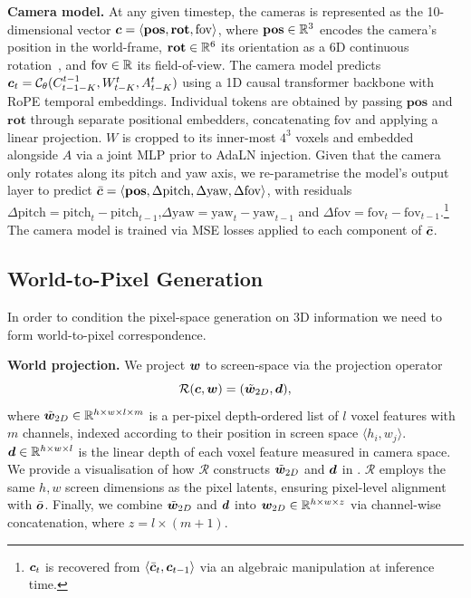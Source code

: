 \textbf{Camera model.} At any given timestep, the cameras is represented as the 10-dimensional vector ${\bm{c}} = \langle\textbf{pos}, \textbf{rot}, \text{fov}\rangle$, where $\textbf{pos}\in {\mathbb{R}}^3$ encodes the camera's position in the world-frame, $\textbf{rot}\in {\mathbb{R}}^6$ its orientation as a 6D continuous rotation~\citep{zhou2019continuity}, and $\text{fov}\in {\mathbb{R}}$ its field-of-view. The camera model predicts ${\bm{c}}_{t} = {\mathcal{C}}_\theta (C^{t-1}_{t-1-K}, W^t_{t-K}, A^t_{t-K})$ using a 1D causal transformer backbone with RoPE temporal embeddings. Individual tokens are obtained by passing $\textbf{pos}$ and $\textbf{rot}$  through separate positional embedders, concatenating $\text{fov}$ and applying a linear projection. $W$ is cropped to its inner-most $4^3$ voxels and embedded alongside $A$ via a joint MLP prior to AdaLN injection. Given that the camera only rotates along its pitch and yaw axis, we re-parametrise the model's output layer to predict $\bar{{\bm{c}}}=\langle \textbf{pos}, \Delta\text{pitch}, \Delta\text{yaw}, \Delta\text{fov}\rangle$, with residuals $\Delta\text{pitch} = \text{pitch}_t - \text{pitch}_{t-1}$,$\Delta\text{yaw} =\text{yaw}_t - \text{yaw}_{t-1}$ and $\Delta \text{fov}=\text{fov}_t - \text{fov}_{t-1}$.\footnote{${\bm{c}}_t$ is recovered from $\langle \bar{{\bm{c}}}_t, {\bm{c}}_{t-1}\rangle$ via an algebraic manipulation at inference time.} The camera model is trained via MSE losses applied to each component of $\bar{{\bm{c}}}$.

\subsection{World-to-Pixel Generation}

In order to condition the pixel-space generation on 3D information we need to form world-to-pixel correspondence.

\textbf{World projection.} We project ${\bm{w}}$ to screen-space via the projection operator \begin{equation}
    \mathcal{R}({\bm{c}}, {\bm{w}}) = (\tilde{{\bm{w}}}_{2D}, {\bm{d}}), 
\end{equation}
where $\tilde{{\bm{w}}}_{2D}  \in \mathbb{R}^{h \times w \times l \times m}$ is a per-pixel depth-ordered list of $l$ voxel features with $m$ channels, indexed according to their position in screen space $\langle h_i, w_j\rangle$. ${\bm{d}} \in \mathbb{R}^{h \times w \times l}$ is the linear depth of each voxel feature measured in camera space. We provide a visualisation of how $\mathcal{R}$ constructs $\tilde{{\bm{w}}}_{2D}$ and ${\bm{d}}$ in . $\mathcal{R}$ employs the same $h,w$ screen dimensions as the pixel latents, ensuring pixel-level alignment with $\bar{{\bm{o}}}$. Finally, we combine $\tilde{{\bm{w}}}_{2D}$ and ${\bm{d}}$ into ${\bm{w}}_{2D}\in \mathbb{R}^{h \times w \times z}$ via channel-wise concatenation, where $z = l \times (m+1)$. %


